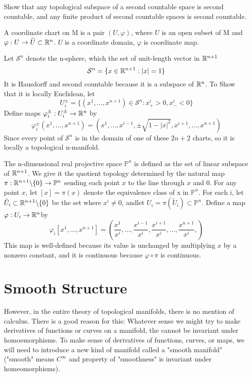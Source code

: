 \begin{exer}
Show that any topological subspace of a second countable space is second countable, and any finite
product of second countable spaces is second countable.
\end{exer}
\begin{definition}
A coordinate chart on M is a pair $(U,\varphi)$, where $U$ is an open subset of M and 
$\varphi:U\rightarrow \widetilde{U}\subset \mathbb{R}^n$. $U$ is a coordinate domain, $\varphi$
is coordinate map.
\end{definition}
\begin{example}
Let $\mathcal{S}^n$ denote the n-sphere, which the set of unit-length vector in $\mathbb{R}^{n+1}$
$$ \mathcal{S}^n = \{x\in \mathbb{R}^{n+1}: |x|=1\}$$
It is Hausdorff and second countable because it is a subspace of $\mathbb{R}^n$. To Show that it
is locally Euclidean, let 
$$ U_i^{\pm}=\{(x^1,\dots,x^{n+1})\in \mathcal{S}^n : x_{+}^i > 0, x_{-}^i < 0 \}$$
Define maps $\varphi_i^{\pm}:U_i^{\pm}\rightarrow\mathbb{R}^n$ by
$$ \varphi_i^{\pm}(x^1,\dots,x^{n+1})=(x^1,\dots,x^{i-1},\pm\sqrt{1-|x|^2},x^{i+1},\dots,x^{n+1})$$
Since every point of $\mathcal{S}^n$ is in the domain of one of these $2n+2$ charts, so
it is locally a topological n-manifold.
\end{example}
\begin{example}
The n-dimensional real projective space $\mathbb{P}^n$ is defined as the set of linear 
subspace of $\mathbb{R}^{n+1}$. We give it the quotient topology determined by the natural map
$\pi:\mathbb{R}^{n+1}\backslash\{0\}\rightarrow\mathbb{P}^n$ sending each point $x$ to the line through
$x$ and 0. For any point $x$, let $[x]=\pi(x)$ denote the equivalence class of x in 
$\mathbb{P}^n$. For each i, let $\tilde{U}_i\subset\mathbb{R}^{n+1}\backslash\{0\}$ be the set 
where $x^i\neq 0$, andlet $U_i=\pi(\tilde{U}_i)\subset \mathbb{P}^n$. Define a map 
$\varphi:U_i\rightarrow\mathbb{R}^n$by $$ \varphi_i[x^1,\dots,x^{n+1}]=\left(\frac{x^1}{x^i},
\dots,\frac{x^{i-1}}{x^i},\frac{x^{i+1}}{x^i},\dots,\frac{x^{n+1}}{x^i},\right)$$
This map is well-defined because its value is unchanged by multiplying $x$ by a nonzero
constant, and it is continuous because $\varphi\circ\pi$ is continuous.
\end{example}

\section{Smooth Structure}
However, in the entire theory of topological manifolds, there is no mention of calculus.
There is a good reason for this: Whatever sense we might try to make derivatives of
functions or curves on a manifold, the cannot be invariant under homoemorphisms.
To make sense of derivatives of functions, curves, or maps, we will need to introduce a
new kind of manifold called a "smooth manifold"("smooth" means $C^\infty$ and property
of "smoothness" is invariant under homeomorphisms).

